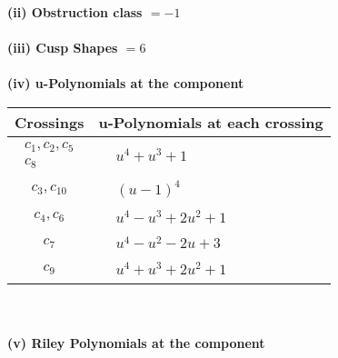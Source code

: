 \documentclass[1p]{elsarticle_modified}
\theoremstyle{definition}
\begin{document}
\flushleft \textbf{(ii) Obstruction class $= -1$}\\~\\
\flushleft \textbf{(iii) Cusp Shapes $= 6$}\\~\\
\newpage\renewcommand{\arraystretch}{1}
\flushleft \textbf{(iv) u-Polynomials at the component}\newline \\
\begin{tabular}{m{50pt}|m{274pt}}
Crossings & \hspace{64pt}u-Polynomials at each crossing \\
\hline $$\begin{aligned}c_{1},c_{2},c_{5}\\c_{8}\end{aligned}$$&$\begin{aligned}
&u^4+u^3+1
\end{aligned}$\\
\hline $$\begin{aligned}c_{3},c_{10}\end{aligned}$$&$\begin{aligned}
&(u-1)^4
\end{aligned}$\\
\hline $$\begin{aligned}c_{4},c_{6}\end{aligned}$$&$\begin{aligned}
&u^4- u^3+2 u^2+1
\end{aligned}$\\
\hline $$\begin{aligned}c_{7}\end{aligned}$$&$\begin{aligned}
&u^4- u^2-2 u+3
\end{aligned}$\\
\hline $$\begin{aligned}c_{9}\end{aligned}$$&$\begin{aligned}
&u^4+u^3+2 u^2+1
\end{aligned}$\\
\hline
\end{tabular}\\~\\
\newpage\renewcommand{\arraystretch}{1}
\flushleft \textbf{(v) Riley Polynomials at the component}\newline \\
\end{document}
